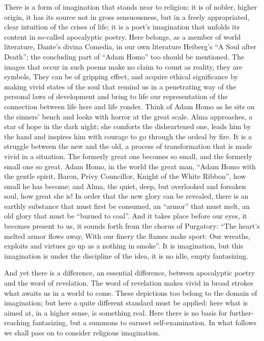 \documentclass[12pt,a4paper,openany]{book}
\newcommand{\opage}[1]{\marginnote{\footnotesize\textit{[#1]}}}
\begin{document}
There is a form of imagination that stands near to religion; it is of nobler, higher origin, it has its
\setcounter{footnote}{0}%
\opage{26}source not in gross sensuousness, but in a freely appropriated, clear intuition of the crises of life; it is
a poet's imagination that unfolds its content in so-called apocalyptic poetry. Here belongs, as a member of world
literature, Dante's divina Comedia, in our own literature Heiberg's ``A Soul after Death''; the concluding part of
``Adam Homo'' too should be mentioned. The images that occur in such poems make no claim to count as reality, they are
symbols, They can be of gripping effect, and acquire ethical significance by making vivid states of the soul that
remind us in a penetrating way of the personal laws of development and bring to life our representation of the
connection between life here and life yonder. Think of Adam Homo as he sits on the sinners' bench and looks with
horror at the great scale. Alma approaches, a star of hope in the dark night; she comforts the disheartened one, leads
him by the hand and inspires him with courage to go through the ordeal by fire. It is a struggle between the new and
the old, a process of transformation that is made vivid in a situation. The formerly great one becomes so small, and
the formerly small one so great. Adam Homo, in the world the great man, ``Adam Homo with the gentle spirit, Baron,
Privy Councillor, Knight of the White Ribbon'', how small he has become; and Alma, the quiet, deep, but overlooked
and forsaken soul, how great she is! In order that the new glory can be revealed, there is an earthly substance that
must first be consumed, an ``armor'' that must melt, an old glory that must be ``burned to coal''. And it takes place
before our eyes, it becomes present to us, it sounds forth from the chorus of Purgatory: ``The heart's melted armor
flows away, With
\setcounter{footnote}{0}%
\opage{27}our finery the flames make sport: Our wreaths, exploits and virtues go up as a nothing in smoke''. It is
imagination, but this imagination is under the discipline of the idea, it is no idle, empty fantasizing.

And yet there is a difference, an essential difference, between apocalyptic poetry and the word of revelation. The word
of revelation makes vivid in broad strokes what awaits us in a world to come. These depictions too belong to the
domain of imagination; but here a quite different standard must be applied: here what is aimed at, in a higher sense,
is something real. Here there is no basis for further-reaching fantasizing, but a summons to earnest self-examination.
In what follows we shall pass on to consider religious imagination.
\end{document}
